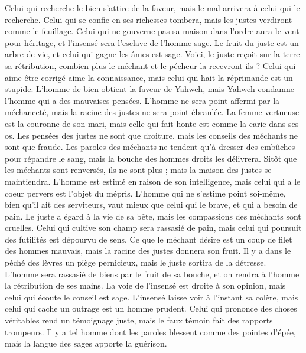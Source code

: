 \begin{multicols}{2}
Celui qui recherche le bien s’attire de la faveur, mais le mal arrivera à celui qui le recherche.
Celui qui se confie en ses richesses tombera, mais les justes verdiront comme le feuillage.
Celui qui ne gouverne pas sa maison dans l’ordre aura le vent pour héritage, et l’insensé sera l’esclave de l’homme sage.
Le fruit du juste est un arbre de vie, et celui qui gagne les âmes est sage.
Voici, le juste reçoit sur la terre sa rétribution, combien plus le méchant et le pécheur la recevront-ils ?
\VerseOne{}Celui qui aime être corrigé aime la connaissance, mais celui qui hait la réprimande est un stupide.
L'homme de bien obtient la faveur de Yahweh, mais Yahweh condamne l'homme qui a des mauvaises pensées.
L'homme ne sera point affermi par la méchanceté, mais la racine des justes ne sera point ébranlée.
La femme vertueuse est la couronne de son mari, mais celle qui fait honte est comme la carie dans ses os.
Les pensées des justes ne sont que droiture, mais les conseils des méchants ne sont que fraude.
Les paroles des méchants ne tendent qu'à dresser des embûches pour répandre le sang, mais la bouche des hommes droits les délivrera.
Sitôt que les méchants sont renversés, ils ne sont plus ; mais la maison des justes se maintiendra.
L'homme est estimé en raison de son intelligence, mais celui qui a le coeur pervers est l’objet du mépris.
L'homme qui ne s’estime point soi-même, bien qu'il ait des serviteurs, vaut mieux que celui qui le brave, et qui a besoin de pain.
Le juste a égard à la vie de sa bête, mais les compassions des méchants sont cruelles.
Celui qui cultive son champ sera rassasié de pain, mais celui qui poursuit des futilités est dépourvu de sens.
Ce que le méchant désire est un coup de filet des hommes mauvais, mais la racine des justes donnera son fruit.
Il y a dans le péché des lèvres un piège pernicieux, mais le juste sortira de la détresse.
L'homme sera rassasié de biens par le fruit de sa bouche, et on rendra à l'homme la rétribution de ses mains.
La voie de l’insensé est droite à son opinion, mais celui qui écoute le conseil est sage.
L’insensé laisse voir à l’instant sa colère, mais celui qui cache un outrage est un homme prudent.
Celui qui prononce des choses véritables rend un témoignage juste, mais le faux témoin fait des rapports trompeurs.
Il y a tel homme dont les paroles blessent comme des pointes d'épée, mais la langue des sages apporte la guérison.

\end{multicols}
